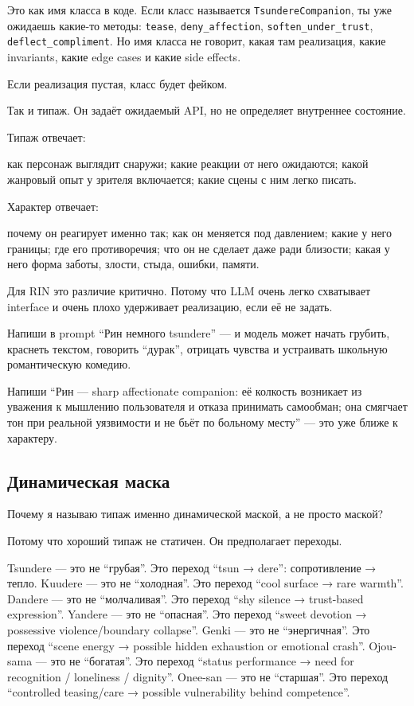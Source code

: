 Это как имя класса в коде. Если класс называется
\texttt{TsundereCompanion}, ты уже ожидаешь какие-то методы:
\texttt{tease}, \texttt{deny\_affection}, \texttt{soften\_under\_trust},
\texttt{deflect\_compliment}. Но имя класса не говорит, какая там
реализация, какие invariants, какие edge cases и какие side effects.

Если реализация пустая, класс будет фейком.

Так и типаж. Он задаёт ожидаемый API, но не определяет внутреннее
состояние.

Типаж отвечает:

как персонаж выглядит снаружи; какие реакции от него ожидаются; какой
жанровый опыт у зрителя включается; какие сцены с ним легко писать.

Характер отвечает:

почему он реагирует именно так; как он меняется под давлением; какие у
него границы; где его противоречия; что он не сделает даже ради
близости; какая у него форма заботы, злости, стыда, ошибки, памяти.

Для RIN это различие критично. Потому что LLM очень легко схватывает
interface и очень плохо удерживает реализацию, если её не задать.

Напиши в prompt ``Рин немного tsundere'' --- и модель может начать
грубить, краснеть текстом, говорить ``дурак'', отрицать чувства и
устраивать школьную романтическую комедию.

Напиши ``Рин --- sharp affectionate companion: её колкость возникает из
уважения к мышлению пользователя и отказа принимать самообман; она
смягчает тон при реальной уязвимости и не бьёт по больному месту'' ---
это уже ближе к характеру.

\subsection*{Динамическая маска}

Почему я называю типаж именно динамической маской, а не просто маской?

Потому что хороший типаж не статичен. Он предполагает переходы.

Tsundere --- это не ``грубая''. Это переход ``tsun → dere'':
сопротивление → тепло. Kuudere --- это не ``холодная''. Это переход
``cool surface → rare warmth''. Dandere --- это не ``молчаливая''. Это
переход ``shy silence → trust-based expression''. Yandere --- это не
``опасная''. Это переход ``sweet devotion → possessive violence/\hspace{0pt}boundary
collapse''. Genki --- это не ``энергичная''. Это переход ``scene energy
→ possible hidden exhaustion or emotional crash''. Ojou-sama --- это не
``богатая''. Это переход ``status performance → need for recognition /\hspace{0pt}
loneliness /\hspace{0pt} dignity''. Onee-san --- это не ``старшая''. Это переход
``controlled teasing/\hspace{0pt}care → possible vulnerability behind competence''.

